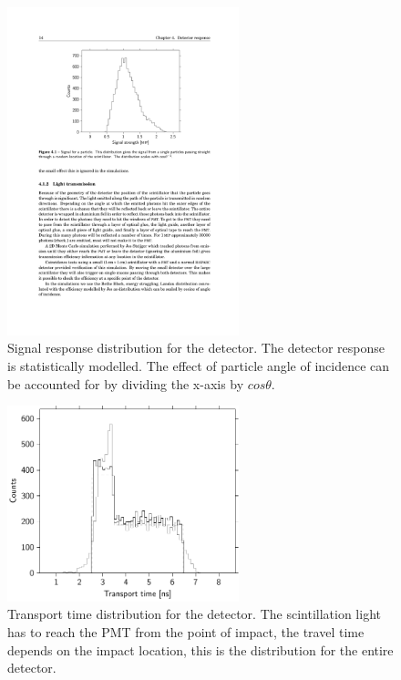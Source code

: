 \begin{figure}
    \centering
    \includegraphics[width=0.6\textwidth]
                    {plots/experiment/signal_response}
    \caption{Signal response distribution for the detector. The detector response is statistically modelled. The effect of particle angle of incidence can be accounted for by dividing the x-axis by $cos \theta$.}
    \label{fig:signal_response}
\end{figure}

\begin{figure}
    \centering
    \includegraphics[width=0.6\textwidth]
                    {plots/experiment/transport_time}
    \caption{Transport time distribution for the detector. The scintillation light has to reach the PMT from the point of impact, the travel time depends on the impact location, this is the distribution for the entire detector.}
    \label{fig:transport_time}
\end{figure}


